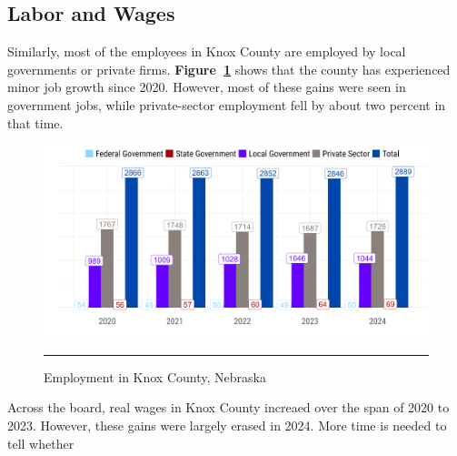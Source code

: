 \pagebreak
\subsection{Labor and Wages}

\noindent Similarly, most of the employees in Knox County are employed by local governments or private firms. \textbf{Figure~\ref{fig:employment}} shows that the county has experienced minor job growth since 2020. However, most of these gains were seen in government jobs, while private-sector employment fell by about two percent in that time.

\begin{figure}[H]
\centering
\begin{framed}
    \caption{Employment in Knox County, Nebraska}
    \label{fig:employment}
    \includegraphics[width=\linewidth]{figures/employment.png}
    \rule[-5pt]{\linewidth}{0.4pt}
\end{framed}
\end{figure}

\pagebreak

\noindent Across the board, real wages in Knox County increaed over the span of 2020 to 2023. However, these gains were largely erased in 2024. More time is needed to tell whether 

